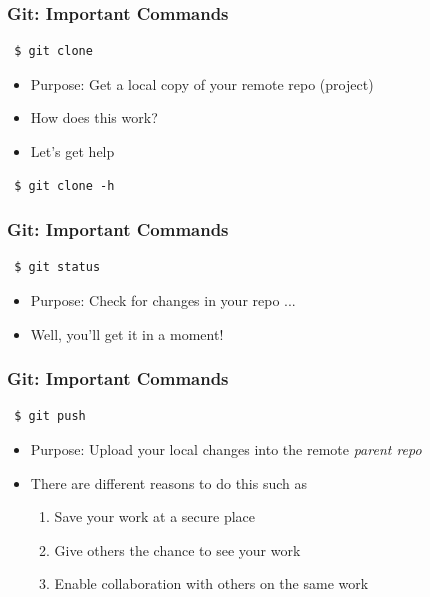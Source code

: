 \documentclass{beamer} %
\begin{document}
\begin{frame}[t, fragile]
\frametitle{Git: Important Commands}

\begin{verbatim} 
 $ git clone
\end{verbatim}

\begin{itemize}
    \setlength\itemsep{1em}
	\item Purpose: Get a local copy of your remote repo (project)
    \item How does this work?
    \item Let's get help
\end{itemize}

\begin{verbatim} 
 $ git clone -h
\end{verbatim}

\end{frame}

\begin{frame}[t, fragile]
\frametitle{Git: Important Commands}

\begin{verbatim} 
 $ git status
\end{verbatim}

\begin{itemize}
    \setlength\itemsep{1em}
	\item Purpose: Check for changes in your repo ...
    \item Well, you'll get it in a moment!
\end{itemize}
\end{frame}

\begin{frame}[t, fragile]
\frametitle{Git: Important Commands}

\begin{verbatim} 
 $ git push
\end{verbatim}

\begin{itemize}
    \setlength\itemsep{1em}
	\item Purpose: Upload your local changes into the remote \emph{parent repo}
	\item There are different reasons to do this such as

	\begin{enumerate}
    	\setlength\itemsep{0.4em}
		\item Save your work at a secure place
        \item Give others the chance to see your work
        \item Enable collaboration with others on the same work
	\end{enumerate}

\end{itemize}
\end{frame}
\end{document}
